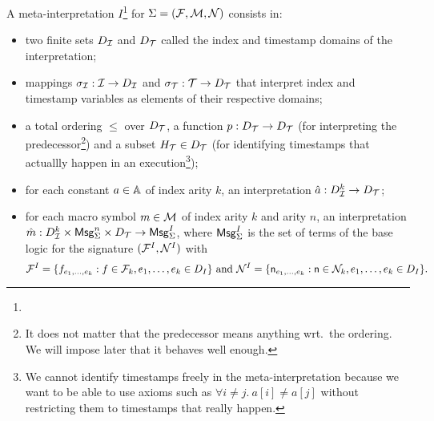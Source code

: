 \begin{definition}
  A meta-interpretation $I$\footnote{} for $\Sigma = (\mathcal{F},\mathcal{M},\mathcal{N})$ consists in:
  \begin{itemize}
    \item two finite sets $D_{\mathcal{I}}$ and $D_{\mathcal{T}}$ called the index and timestamp
      domains of the interpretation;
    \item mappings $\sigma_{\mathcal{I}} : \mathcal{I} \to D_{\mathcal{I}}$
      and $\sigma_{\mathcal{T}} : \mathcal{T} \to D_{\mathcal{T}}$ that interpret index and
      timestamp variables as elements of their respective domains;
    \item a total ordering $\leq$ over $D_{\mathcal{T}}$,
      a function $p : D_{\mathcal{T}} \to D_{\mathcal{T}}$ (for interpreting the
      predecessor\footnote{
        It does not matter that the predecessor means anything
        wrt.\ the ordering. We will impose later that it behaves
        well enough.
      })
      and a subset $H_{\mathcal{T}}\in D_{\mathcal{T}}$ (for identifying timestamps
      that actuallly happen in an execution\footnote{
        We cannot identify timestamps freely in the meta-interpretation
        because we want to be able to use axioms such as
        $\forall i\neq j.~ a[i] \neq a[j]$ without restricting
        them to timestamps that really happen.
      });
    \item for each constant $a \in \mathbb{A}$ of index arity $k$,
      an interpretation $\hat{a} : D_{\mathcal{I}}^k \to D_{\mathcal{T}}$;
    \item for each macro symbol $m \in \mathcal{M}$ of index
      arity $k$ and arity $n$, an interpretation
      $\hat{m} : D_{\mathcal{I}}^k \times \mathsf{Msg}_\Sigma^n \times D_{\mathcal{T}} \to \mathsf{Msg}^I_\Sigma$,
      where $\mathsf{Msg}^I_\Sigma$ is the set of terms of the base
      logic for the signature
      $(\mathcal{F}^I,\mathcal{N}^I)$ with
      \[
        \mathcal{F}^I =
        \{ f_{e_1,\ldots,e_k} : f \in \mathcal{F}_k, e_1,\ldots,e_k \in D_I \}
        \text{ and }
        \mathcal{N}^I = \{ \mathsf{n}_{e_1,\ldots,e_k} : \mathsf{n}\in\mathcal{N}_k,
        e_1,\ldots,e_k\in D_I \}.
      \]
  \end{itemize}
\end{definition}

